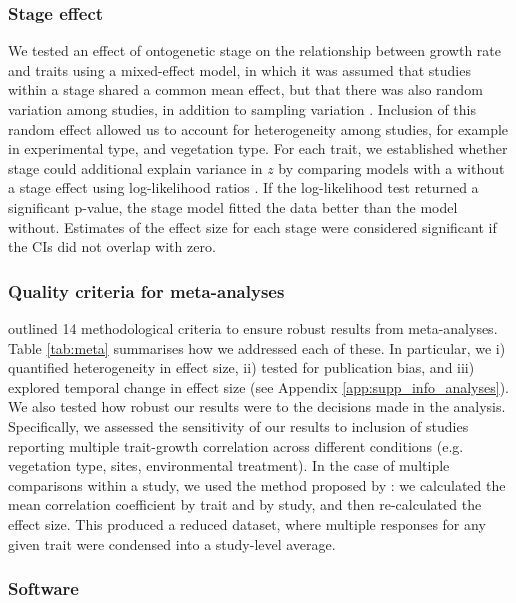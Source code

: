 \documentclass[a4paper,11pt]{article}
\begin{document}
\subsubsection*{Stage effect}\label{stage-effect}

We tested an effect of ontogenetic stage on the relationship between growth rate and traits using a mixed-effect model, in which it was assumed that studies within a stage shared a common mean effect, but that there was also random variation among studies, in addition to sampling variation \citep{Zuur:2009cfa}. Inclusion of this random effect allowed us to account for heterogeneity among studies, for example in experimental type, and vegetation type. For each trait, we established whether stage could additional explain variance in $z$ by comparing models with a without a stage effect  using log-likelihood ratios \citep{Zuur:2009cfa}. If the log-likelihood test returned a significant p-value, the stage model fitted the data better than the model without. Estimates of the effect size for each stage were considered significant if the CIs did not overlap with zero.

\subsubsection*{Quality criteria for meta-analyses}

\citet{Koricheva:2014ku} outlined 14 methodological criteria to ensure robust results from meta-analyses. Table \ref{tab:meta} summarises how we addressed each of these. In particular, we i) quantified heterogeneity in effect size, ii) tested for publication bias, and iii) explored temporal change in effect size (see Appendix \ref{app:supp_info_analyses}).
We also tested how robust our results were to the decisions made in the analysis. Specifically, we assessed the sensitivity of our results to inclusion of studies reporting multiple trait-growth correlation across different conditions (e.g. vegetation type, sites, environmental treatment). In the case of multiple comparisons within a study, we used the method proposed by \citet{Borenstein:2009um}: we calculated the mean correlation coefficient by trait and by study, and then re-calculated the effect size. This produced a reduced dataset, where multiple responses for any given trait were condensed into a study-level average.

\subsubsection*{Software}
\end{document}
